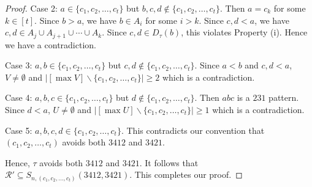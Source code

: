 \documentclass[10pt,a4paper]{amsart}
\begin{document}
\begin{proof}
    Case 2: $a\in\{c_1,c_2,\ldots,c_t\}$ but $b,c,d\notin\{c_1,c_2,\ldots,c_t\}$. Then $a=c_k$ for some $k\in[t]$. Since $b>a$, we have $b\in A_{i}$ for some $i>k$. Since $c,d<a$, we have $c,d\in A_j\cup A_{j+1}\cup\cdots \cup A_{k}$. Since $c,d\in D_\tau(b)$, this violates Property (i). Hence we have a contradiction.

    Case 3: $a,b\in\{c_1,c_2,\ldots,c_t\}$ but $c,d\notin\{c_1,c_2,\ldots,c_t\}$. Since $a<b$ and $c,d<a$, $V\neq\emptyset$ and $\left|[\max V]\backslash\{c_1,c_2,\ldots,c_t\}\right|\geq2$ which is a contradiction.

    Case 4: $a,b,c\in\{c_1,c_2,\ldots,c_t\}$ but $d\notin\{c_1,c_2,\ldots,c_t\}$. Then $abc$ is a $231$ pattern. Since $d<a$, $U\neq\emptyset$ and $\left|[\max U]\backslash\{c_1,c_2,\ldots,c_t\}\right|\geq1$ which is a contradiction.

    Case 5: $a,b,c,d\in\{c_1,c_2,\ldots,c_t\}$. This contradicts our convention that $(c_1,c_2,\ldots,c_t)$ avoids both $3412$ and $3421$.

    Hence, $\tau$ avoids both $3412$ and $3421$. It follows that $\mathcal{R}'\subseteq S_{n,(c_1,c_2,\ldots,c_t)}(3412,3421)$. This completes our proof.
\end{proof}
\end{document}
